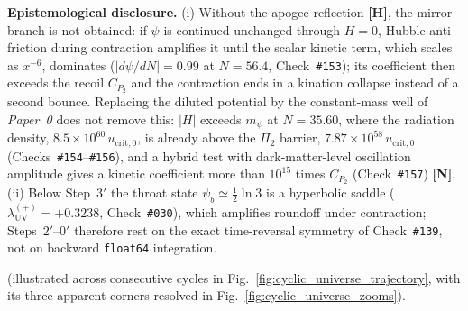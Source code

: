 \documentclass[11pt,a4paper]{article}
\newcommand{\catH}{\textbf{\textcolor{orange!85!black}{[H]}}}
\newcommand{\catN}{\textbf{\textcolor{teal!75!black}{[N]}}}
\theoremstyle{plain}
\theoremstyle{definition}
\theoremstyle{remark}
\numberwithin{equation}{section}
\begin{document}
\begin{enumerate}
  \textbf{Epistemological disclosure.} (i) Without the apogee reflection \catH, the mirror branch is not obtained: if $\dot{\psi}$ is continued unchanged through $H = 0$, Hubble anti-friction during contraction amplifies it until the scalar kinetic term, which scales as $x^{-6}$, dominates ($|d\psi/dN| = 0.99$ at $N = 56.4$, Check~\texttt{\#153}); its coefficient then exceeds the recoil $C_{P_2}$ and the contraction ends in a kination collapse instead of a second bounce. Replacing the diluted potential by the constant-mass well of \textit{Paper~0} does not remove this: $|H|$ exceeds $m_{\psi}$ at $N = 35.60$, where the radiation density, $8.5 \times 10^{60}\,u_{\text{crit},0}$, is already above the $\Pi_2$ barrier, $7.87 \times 10^{58}\,u_{\text{crit},0}$ (Checks~\texttt{\#154}--\texttt{\#156}), and a hybrid test with dark-matter-level oscillation amplitude gives a kinetic coefficient more than $10^{15}$ times $C_{P_2}$ (Check~\texttt{\#157}) \catN. (ii) Below Step~$3'$ the throat state $\psi_b \simeq \frac{1}{2}\ln 3$ is a hyperbolic saddle ($\lambda_{\text{UV}}^{(+)} = +0.3238$, Check~\texttt{\#030}), which amplifies roundoff under contraction; Steps~$2'$--$0'$ therefore rest on the exact time-reversal symmetry of Check~\texttt{\#139}, not on backward \texttt{float64} integration.
\end{enumerate}
(illustrated across consecutive cycles in Fig.~\ref{fig:cyclic_universe_trajectory}, with its three apparent corners resolved in Fig.~\ref{fig:cyclic_universe_zooms}).
\end{document}
